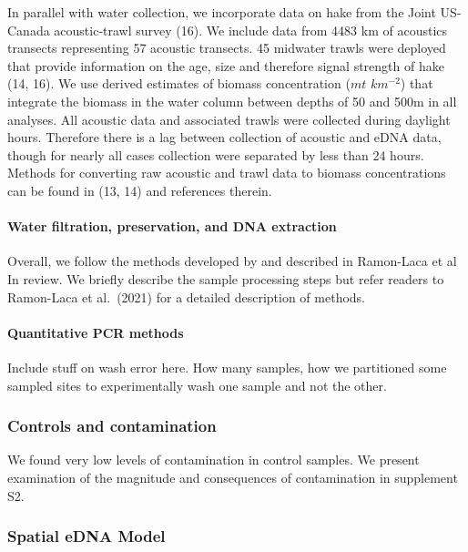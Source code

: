 \documentclass[
]{article}
\begin{document}
In parallel with water collection, we incorporate data on hake from the
Joint US-Canada acoustic-trawl survey (16). We include data from 4483 km
of acoustics transects representing 57 acoustic transects. 45 midwater
trawls were deployed that provide information on the age, size and
therefore signal strength of hake (14, 16). We use derived estimates of
biomass concentration (\(mt\) \(km^{-2}\)) that integrate the biomass in
the water column between depths of 50 and 500m in all analyses. All
acoustic data and associated trawls were collected during daylight
hours. Therefore there is a lag between collection of acoustic and eDNA
data, though for nearly all cases collection were separated by less than
24 hours. Methods for converting raw acoustic and trawl data to biomass
concentrations can be found in (13, 14) and references therein.

\hypertarget{water-filtration-preservation-and-dna-extraction}{%
\paragraph{Water filtration, preservation, and DNA
extraction}\label{water-filtration-preservation-and-dna-extraction}}

Overall, we follow the methods developed by and described in Ramon-Laca
et al In review. We briefly describe the sample processing steps but
refer readers to Ramon-Laca et al.~(2021) for a detailed description of
methods.

\hypertarget{quantitative-pcr-methods}{%
\paragraph{Quantitative PCR methods}\label{quantitative-pcr-methods}}

Include stuff on wash error here. How many samples, how we partitioned
some sampled sites to experimentally wash one sample and not the other.

\hypertarget{controls-and-contamination}{%
\subsubsection{Controls and
contamination}\label{controls-and-contamination}}

We found very low levels of contamination in control samples. We present
examination of the magnitude and consequences of contamination in
supplement S2.

\hypertarget{spatial-edna-model}{%
\subsubsection{Spatial eDNA Model}\label{spatial-edna-model}}
\end{document}
